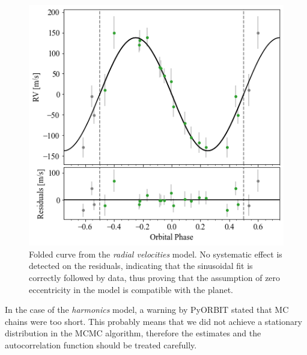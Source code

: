 \documentclass[a4paper,11pt,twocolumn]{article}
\begin{document}
\begin{figure}[H]
	\centering
	\includegraphics[scale=0.45, angle=0]{../pictures/RV/RV.png}
	\caption{Folded curve from the \textit{radial velocities} model. No systematic effect is detected on the residuals, 
    indicating that the sinusoidal fit is correctly followed by data, thus proving that the assumption of zero eccentricity 
    in the model is compatible with the planet.}
	\label{fig:RV1}
\end{figure}

In the case of the \textit{harmonics} model, a warning by PyORBIT stated 
that MC chains were too short. This probably means that we did not 
achieve a stationary distribution in the MCMC algorithm, therefore the 
estimates and the autocorrelation function should be treated carefully.
\end{document}
